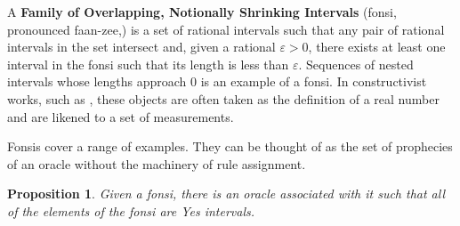 \documentclass[12pt]{article}
\newtheorem{proposition}{Proposition}[section]
\begin{document}
 A \textbf{Family of Overlapping, Notionally Shrinking Intervals} (fonsi, pronounced faan-zee,) is a set of rational intervals such that any pair of rational intervals in the set intersect and, given a rational $\varepsilon >0$, there exists at least one interval in the fonsi such that its length is less than $\varepsilon$. Sequences of nested intervals whose lengths approach 0 is an example of a fonsi. In constructivist works, such as \cite{bridger}, these objects are often taken as the definition of a real number and are likened to a set of measurements. 

Fonsis cover a range of examples. They can be thought of as the set of prophecies of an oracle without the machinery of rule assignment. 

\begin{proposition}
    Given a fonsi, there is an oracle associated with it such that all of the elements of the fonsi are Yes intervals. 
\end{proposition}
\end{document}
